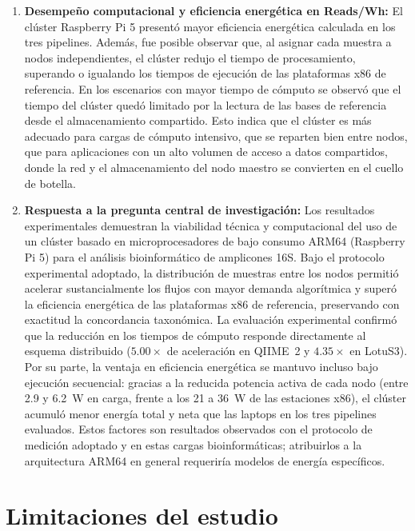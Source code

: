 \documentclass[12pt,oneside,spanish]{book}
\begin{document}
\begin{enumerate}
        \item \textbf{Desempeño computacional y eficiencia energética en Reads/Wh:} El clúster Raspberry Pi 5 presentó mayor eficiencia energética calculada en los tres pipelines. Además, fue posible observar que, al asignar cada muestra a nodos independientes, el clúster redujo el tiempo de procesamiento, superando o igualando los tiempos de ejecución de las plataformas x86 de referencia. En los escenarios con mayor tiempo de cómputo se observó que el tiempo del clúster quedó limitado por la lectura de las bases de referencia desde el almacenamiento compartido. Esto indica que el clúster es más adecuado para cargas de cómputo intensivo, que se reparten bien entre nodos, que para aplicaciones con un alto volumen de acceso a datos compartidos, donde la red y el almacenamiento del nodo maestro se convierten en el cuello de botella.
    
        \item \textbf{Respuesta a la pregunta central de investigación:} Los resultados experimentales demuestran la viabilidad técnica y computacional del uso de un clúster basado en microprocesadores de bajo consumo ARM64 (Raspberry Pi 5) para el análisis bioinformático de amplicones 16S. Bajo el protocolo experimental adoptado, la distribución de muestras entre los nodos permitió acelerar sustancialmente los flujos con mayor demanda algorítmica y superó la eficiencia energética de las plataformas x86 de referencia, preservando con exactitud la concordancia taxonómica. La evaluación experimental confirmó que la reducción en los tiempos de cómputo responde directamente al esquema distribuido ($5.00\times$ de aceleración en QIIME~2 y $4.35\times$ en LotuS3). Por su parte, la ventaja en eficiencia energética se mantuvo incluso bajo ejecución secuencial: gracias a la reducida potencia activa de cada nodo (entre 2.9 y 6.2~W en carga, frente a los 21 a 36~W de las estaciones x86), el clúster acumuló menor energía total y neta que las laptops en los tres pipelines evaluados. Estos factores son resultados observados con el protocolo de medición adoptado y en estas cargas bioinformáticas; atribuirlos a la arquitectura ARM64 en general requeriría modelos de energía específicos.
        
    \end{enumerate}
    
    \section{Limitaciones del estudio}
\end{document}
